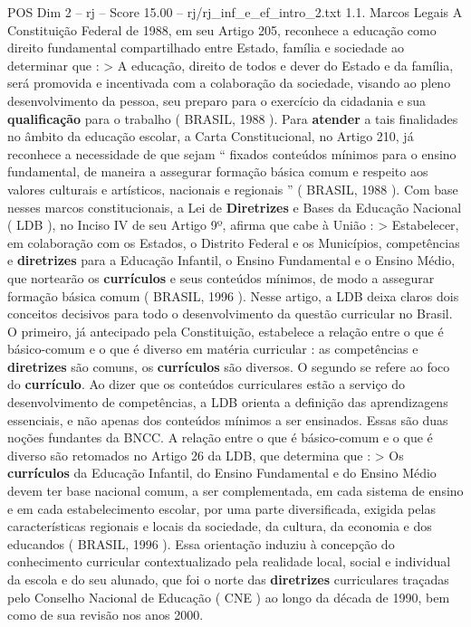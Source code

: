 \begin{textsample}{POS Dim 2 – rj – Score 15.00 – rj/rj\_inf\_e\_ef\_intro\_2.txt}  \label{ex:f2_pos_237}
1.1.
Marcos Legais A Constituição Federal de 1988, em seu Artigo 205, reconhece a educação como direito fundamental compartilhado entre Estado, família e sociedade ao determinar que : > A educação, direito de todos e dever do Estado e da família, será promovida e incentivada com a colaboração da sociedade, visando ao pleno desenvolvimento da pessoa, seu preparo para o exercício da cidadania e sua \textbf{qualificação} para o trabalho ( BRASIL, 1988 ).
Para \textbf{atender} a tais finalidades no âmbito da educação escolar, a Carta Constitucional, no Artigo 210, já reconhece a necessidade de que sejam “ fixados conteúdos mínimos para o ensino fundamental, de maneira a assegurar formação básica comum e respeito aos valores culturais e artísticos, nacionais e regionais ” ( BRASIL, 1988 ).
Com base nesses marcos constitucionais, a Lei de \textbf{Diretrizes} e Bases da Educação Nacional ( LDB ), no Inciso IV de seu Artigo 9º, afirma que cabe à União : > Estabelecer, em colaboração com os Estados, o Distrito Federal e os Municípios, competências e \textbf{diretrizes} para a Educação Infantil, o Ensino Fundamental e o Ensino Médio, que nortearão os \textbf{currículos} e seus conteúdos mínimos, de modo a assegurar formação básica comum ( BRASIL, 1996 ).
Nesse artigo, a LDB deixa claros dois conceitos decisivos para todo o desenvolvimento da questão curricular no Brasil.
O primeiro, já antecipado pela Constituição, estabelece a relação entre o que é básico-comum e o que é diverso em matéria curricular : as competências e \textbf{diretrizes} são comuns, os \textbf{currículos} são diversos.
O segundo se refere ao foco do \textbf{currículo}.
Ao dizer que os conteúdos curriculares estão a serviço do desenvolvimento de competências, a LDB orienta a definição das aprendizagens essenciais, e não apenas dos conteúdos mínimos a ser ensinados.
Essas são duas noções fundantes da BNCC.
A relação entre o que é básico-comum e o que é diverso são retomados no Artigo 26 da LDB, que determina que : > Os \textbf{currículos} da Educação Infantil, do Ensino Fundamental e do Ensino Médio devem ter base nacional comum, a ser complementada, em cada sistema de ensino e em cada estabelecimento escolar, por uma parte diversificada, exigida pelas características regionais e locais da sociedade, da cultura, da economia e dos educandos ( BRASIL, 1996 ).
Essa orientação induziu à concepção do conhecimento curricular contextualizado pela realidade local, social e individual da escola e do seu alunado, que foi o norte das \textbf{diretrizes} curriculares traçadas pelo Conselho Nacional de Educação ( CNE ) ao longo da década de 1990, bem como de sua revisão nos anos 2000.

\end{textsample}
